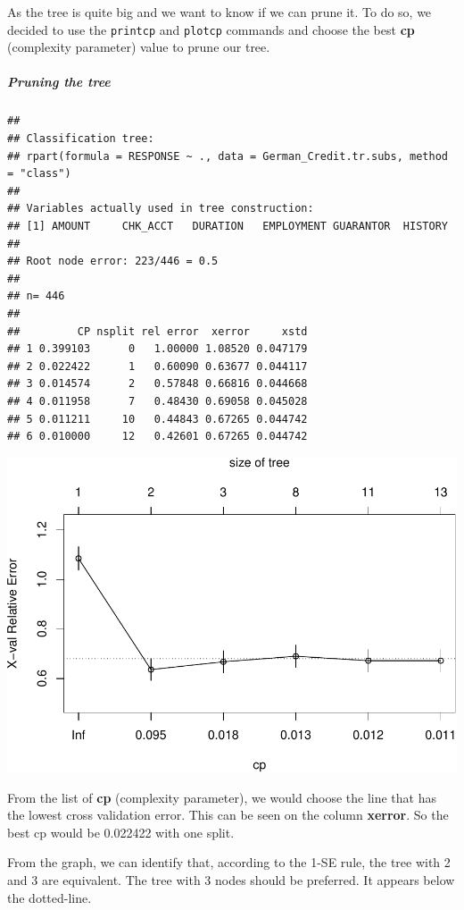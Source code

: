 \documentclass[
]{article}
\begin{document}
As the tree is quite big and we want to know if we can prune it. To do
so, we decided to use the \texttt{printcp} and \texttt{plotcp} commands
and choose the best \textbf{cp} (complexity parameter) value to prune
our tree.

\hypertarget{pruning-the-tree}{%
\subparagraph{Pruning the tree}\label{pruning-the-tree}}

\begin{verbatim}
## 
## Classification tree:
## rpart(formula = RESPONSE ~ ., data = German_Credit.tr.subs, method = "class")
## 
## Variables actually used in tree construction:
## [1] AMOUNT     CHK_ACCT   DURATION   EMPLOYMENT GUARANTOR  HISTORY   
## 
## Root node error: 223/446 = 0.5
## 
## n= 446 
## 
##         CP nsplit rel error  xerror     xstd
## 1 0.399103      0   1.00000 1.08520 0.047179
## 2 0.022422      1   0.60090 0.63677 0.044117
## 3 0.014574      2   0.57848 0.66816 0.044668
## 4 0.011958      7   0.48430 0.69058 0.045028
## 5 0.011211     10   0.44843 0.67265 0.044742
## 6 0.010000     12   0.42601 0.67265 0.044742
\end{verbatim}

\begin{center}\includegraphics{report_files/figure-latex/unnamed-chunk-30-1} \end{center}

From the list of \textbf{cp} (complexity parameter), we would choose the
line that has the lowest cross validation error. This can be seen on the
column \textbf{xerror}. So the best cp would be 0.022422 with one split.

From the graph, we can identify that, according to the 1-SE rule, the
tree with 2 and 3 are equivalent. The tree with 3 nodes should be
preferred. It appears below the dotted-line.
\end{document}
